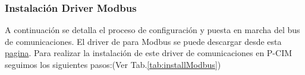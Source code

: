 \subsubsection{Instalación Driver Modbus}
A continuación se detalla el  proceso de configuración y puesta en marcha del 
bus de comunicaciones. El driver de para Modbus se puede descargar desde esta 
\href{http://www.afcon-inc.com/afcon/Templates/showpage.asp?TMID=402&FID=832}{pagina}.
Para realizar la instalación de este driver de comunicaciones en P-CIM seguimos 
los siguientes pasos:(Ver Tab.\ref{tab:installModbus})
